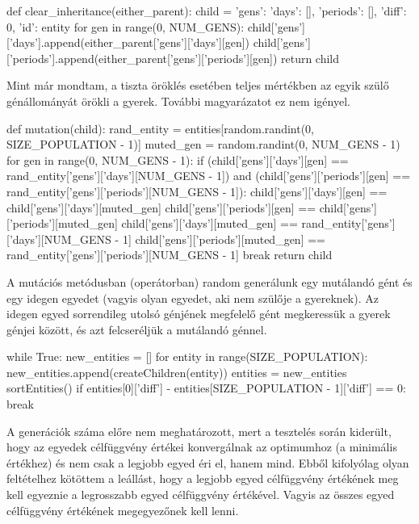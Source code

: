 \documentclass[12pt,a4paper]{report}
\begin{document}
\begin{python}
def clear_inheritance(either_parent):
    child = {'gens': {'days': [], 'periods': []}, 'diff': 0, 'id': entity}
    for gen in range(0, NUM_GENS):
        child['gens']['days'].append(either_parent['gens']['days'][gen])
        child['gens']['periods'].append(either_parent['gens']['periods'][gen])
    return child
\end{python}

Mint már mondtam, a tiszta öröklés esetében teljes mértékben az egyik szülő génállományát örökli a gyerek. További magyarázatot ez nem igényel.

\begin{python}
def mutation(child):
    rand_entity = entities[random.randint(0, SIZE_POPULATION - 1)]
    muted_gen = random.randint(0, NUM_GENS - 1)
    for gen in range(0, NUM_GENS - 1):
        if (child['gens']['days'][gen] == rand_entity['gens']['days'][NUM_GENS - 1]) and (child['gens']['periods'][gen] == rand_entity['gens']['periods'][NUM_GENS - 1]):
            child['gens']['days'][gen] == child['gens']['days'][muted_gen]
            child['gens']['periods'][gen] == child['gens']['periods'][muted_gen]
            child['gens']['days'][muted_gen] == rand_entity['gens']['days'][NUM_GENS - 1]
            child['gens']['periods'][muted_gen] == rand_entity['gens']['periods'][NUM_GENS - 1]
            break
    return child
\end{python}

A mutációs metódusban (operátorban) random generálunk egy mutálandó gént és egy idegen egyedet (vagyis olyan egyedet, aki nem szülője a gyereknek). Az idegen egyed sorrendileg utolsó génjének megfelelő gént megkeressük a gyerek génjei között, és azt felcseréljük a mutálandó génnel.

\begin{python}
while True:
    new_entities = []
    for entity in range(SIZE_POPULATION):
        new_entities.append(createChildren(entity))
    entities = new_entities
    sortEntities()
    if entities[0]['diff'] - entities[SIZE_POPULATION - 1]['diff'] == 0:
        break
\end{python}

A generációk száma előre nem meghatározott, mert a tesztelés során kiderült, hogy az egyedek célfüggvény értékei konvergálnak az optimumhoz (a minimális értékhez) és nem csak a legjobb egyed éri el, hanem mind. Ebből kifolyólag olyan feltételhez kötöttem a leállást, hogy a legjobb egyed célfüggvény értékének meg kell egyeznie a legrosszabb egyed célfüggvény értékével. Vagyis az összes egyed célfüggvény értékének megegyezőnek kell lenni.
\end{document}

